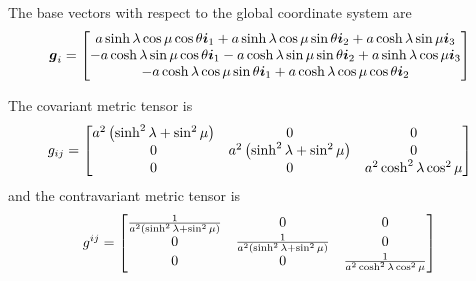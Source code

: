 The base vectors with respect to the global coordinate system are
\begin{equation}
  \boldsymbol{g}_{i}=\begin{bmatrix} 
    a\sinh\lambda\cos\mu\cos\theta\boldsymbol{i}_{1}+a\sinh\lambda\cos\mu\sin\theta\boldsymbol{i}_{2}+a\cosh\lambda\sin\mu\boldsymbol{i}_{3}\\
    -a\cosh\lambda\sin\mu\cos\theta\boldsymbol{i}_{1}-a\cosh\lambda\sin\mu\sin\theta\boldsymbol{i}_{2}+a\sinh\lambda\cos\mu\boldsymbol{i}_{3}\\    
    -a\cosh\lambda\cos\mu\sin\theta\boldsymbol{i}_{1}+a\cosh\lambda\cos\mu\cos\theta\boldsymbol{i}_{2}
  \end{bmatrix}
\end{equation}

The covariant metric tensor is
\begin{equation}
  g_{ij}=\begin{bmatrix}
    a^{2}\left( \sinh^{2}\lambda+\sin^{2}\mu \right) & 0 & 0 \\
    0 & a^{2}\left( \sinh^{2}\lambda+\sin^{2}\mu \right) & 0 \\
    0 & 0 & a^{2}\cosh^{2}\lambda\cos^{2}\mu 
  \end{bmatrix}
\end{equation}
and the contravariant metric tensor is
\begin{equation}
  g^{ij}=\begin{bmatrix}
    \frac{1}{a^{2}\left( \sinh^{2}\lambda+\sin^{2}\mu \right)}& 0 & 0 \\
    0 & \frac{1}{a^{2}\left( \sinh^{2}\lambda+\sin^{2}\mu \right)} & 0 \\
    0 & 0 & \frac{1}{a^{2}\cosh^{2}\lambda\cos^{2}\mu}
  \end{bmatrix}
\end{equation}

